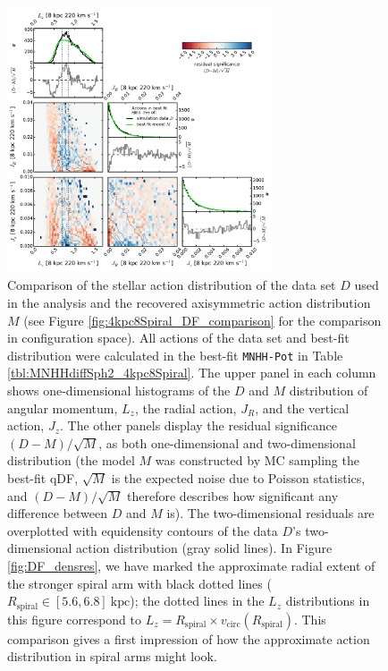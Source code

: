 \documentclass[iop,revtex4,numberedappendix,appendixfloats]{emulateapj}
\begin{document}
\begin{figure}[!htbp]
\centering
\includegraphics[width=0.7\textwidth]{fig/MNdHHdiffSph2_4kpc8Spiral_a_data_bestfit_residuals_only_actions.pdf}
\caption{Comparison of the stellar action distribution of the data set $D$ used in the analysis and the recovered axisymmetric action distribution $M$ (see Figure \ref{fig:4kpc8Spiral_DF_comparison} for the comparison in configuration space). All actions of the data set and best-fit distribution were calculated in the best-fit \texttt{MNHH-Pot} in Table \ref{tbl:MNHHdiffSph2_4kpc8Spiral}. The upper panel in each column shows one-dimensional histograms of the $D$ and $M$ distribution of angular momentum, $L_z$, the radial action, $J_R$, and the vertical action, $J_z$. The other panels display the residual significance $(D-M)/\sqrt{M}$, as both one-dimensional and two-dimensional distribution (the model $M$ was constructed by MC sampling the best-fit qDF, $\sqrt{M}$ is the expected noise due to Poisson statistics, and $(D-M)/\sqrt{M}$ therefore describes how significant any difference between $D$ and $M$ is). The two-dimensional residuals are overplotted with equidensity contours of the data $D$'s two-dimensional action distribution (gray solid lines). In Figure \ref{fig:DF_densres}, we have marked the approximate radial extent of the stronger spiral arm with black dotted lines ($R_\text{spiral} \in [5.6,6.8]~\text{kpc}$); the dotted lines in the $L_z$ distributions in this figure correspond to $L_z = R_\text{spiral} \times v_\text{circ}(R_\text{spiral})$. This comparison gives a first impression of how the approximate action distribution in spiral arms might look.}
\label{fig:4kpc8Spiral_actions}
\end{figure}
\end{document}
